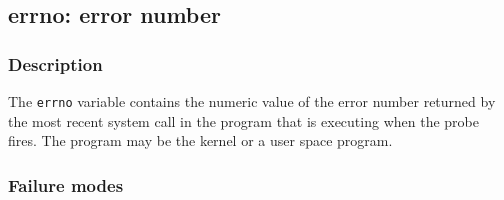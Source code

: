 \clearpage
{}
{}
\label{vars:errno}
\subsection*{errno: error number}

\subsubsection*{Description}

The \verb|errno| variable contains the numeric value of the error
number returned by the most recent system call in the program that is
executing when the probe fires.  The program may be the kernel or a
user space program.

\subsubsection*{Failure modes}


